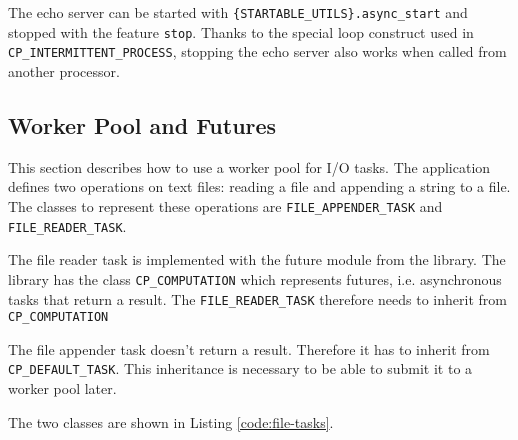 The echo server can be started with \lstinline!{STARTABLE_UTILS}.async_start! and stopped with the feature \lstinline!stop!.
Thanks to the special loop construct used in \lstinline!CP_INTERMITTENT_PROCESS!, stopping the echo server also works when called from another processor.

\subsection{Worker Pool and Futures}

This section describes how to use a worker pool for I/O tasks.
The application defines two operations on text files: reading a file and appending a string to a file.
The classes to represent these operations are \lstinline!FILE_APPENDER_TASK! and \lstinline!FILE_READER_TASK!.

The file reader task is implemented with the future module from the library.
The library has the class \lstinline!CP_COMPUTATION! which represents futures, i.e. asynchronous tasks that return a result.
The \lstinline!FILE_READER_TASK! therefore needs to inherit from \lstinline!CP_COMPUTATION!

The file appender task doesn't return a result.
Therefore it has to inherit from \lstinline!CP_DEFAULT_TASK!.
This inheritance is necessary to be able to submit it to a worker pool later.

The two classes are shown in Listing \ref{code:file-tasks}.

